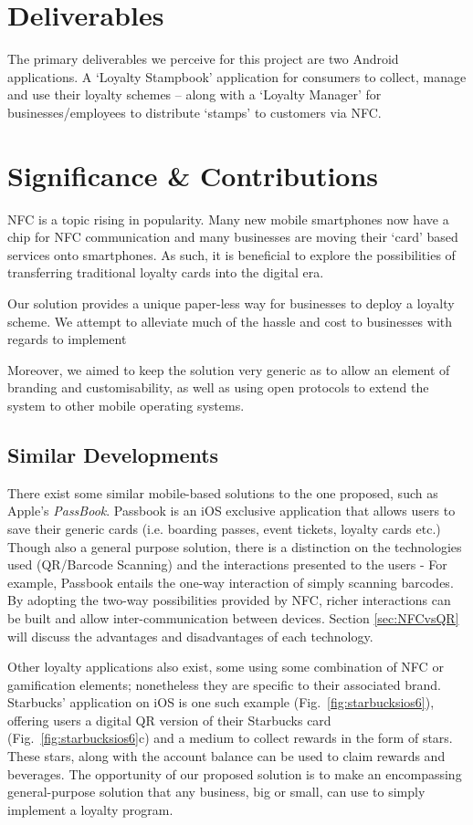 \section{Deliverables}
The primary deliverables we perceive for this project are two Android applications. A `Loyalty Stampbook' application for consumers to collect, manage and use their loyalty schemes -- along with a `Loyalty Manager' for businesses/employees to distribute `stamps' to customers via NFC.  

\section{Significance \& Contributions}
NFC is a topic rising in popularity. Many new mobile smartphones now have a chip for NFC communication and many businesses are moving their `card' based services onto smartphones. As such, it is beneficial to explore the possibilities of transferring traditional loyalty cards into the digital era. 

Our solution provides a unique paper-less way for businesses to deploy a loyalty scheme. We attempt to alleviate much of the hassle and cost to businesses with regards to implement

Moreover, we aimed to keep the solution very generic as to allow an element of branding and customisability, as well as using open protocols to extend the system to other mobile operating systems.   

\subsection{Similar Developments}
There exist some similar mobile-based solutions to the one proposed, such as Apple's \emph{PassBook}. Passbook is an iOS exclusive application that allows users to save their generic cards (i.e. boarding passes, event tickets, loyalty cards etc.) Though also a general purpose solution, there is a distinction on the technologies used (QR/Barcode Scanning) and the interactions presented to the users - For example, Passbook entails the one-way interaction of simply scanning barcodes. By adopting the two-way possibilities provided by NFC, richer interactions can be built and allow inter-communication between devices. Section \ref{sec:NFCvsQR} will discuss the advantages and disadvantages of each technology.

Other loyalty applications also exist, some using some combination of NFC or gamification elements; nonetheless they are specific to their associated brand. Starbucks' application on iOS is one such example (Fig.~\ref{fig:starbucksios6}), offering users a digital QR version of their Starbucks card (Fig.~\ref{fig:starbucksios6}c) and a medium to collect rewards in the form of stars. These stars, along with the account balance can be used to claim rewards and beverages. The opportunity of our proposed solution is to make an encompassing general-purpose solution that any business, big or small, can use to simply implement a loyalty program.

